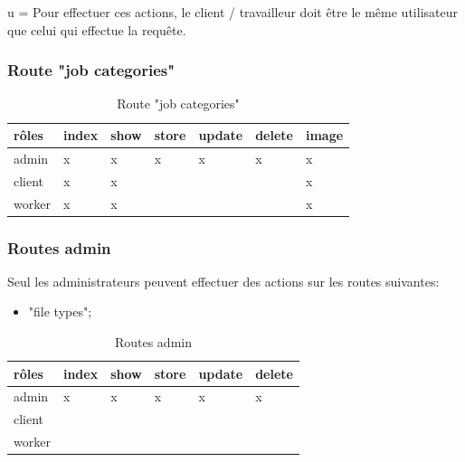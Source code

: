 \documentclass[
    iai, %
    il, %
]{heig-tb}
\begin{document}
u = Pour effectuer ces actions, le client / travailleur doit être le même utilisateur que celui qui effectue la requête.

\subsubsection{Route "job categories"}

\begin{table}[h]
    \begin{center}
        \caption{Route "job categories" \label{autorisations-route-job-categories}}
        \begin{tabularx}{1.0\textwidth} {X|X}
            rôles  & index & show & store & update & delete & image \\ \hline
            admin  & x     & x    & x     & x      & x      & x     \\
            client & x     & x    &       &        &        & x     \\
            worker & x     & x    &       &        &        & x     \\
        \end{tabularx}
    \end{center}
\end{table}

\subsubsection{Routes admin}
Seul les administrateurs peuvent effectuer des actions sur les routes suivantes:

\begin{itemize}
    \item "file types";
\end{itemize}

\begin{table}[h]
    \begin{center}
        \caption{Routes admin \label{autorisations-route-admin}}
        \begin{tabularx}{1.0\textwidth} {X|X}
            rôles  & index & show & store & update & delete \\ \hline
            admin  & x     & x    & x     & x      & x      \\
            client &       &      &       &        &        \\
            worker &       &      &       &        &        \\
        \end{tabularx}
    \end{center}
\end{table}
\end{document}
